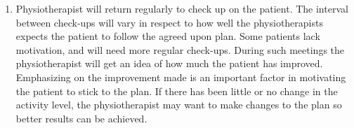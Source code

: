 \begin{enumerate}
  \item Physiotherapist will return regularly to check up on the patient. The interval between check-ups will vary in respect to how well the physiotherapists expects the patient to follow the agreed upon plan. Some patients lack motivation, and will need more regular check-ups. During such meetings the physiotherapist will get an idea of how much the patient has improved. Emphasizing on the improvement made is an important factor in motivating the patient to stick to the plan. If there has been little or no change in the activity level, the physiotherapist may want to make changes to the plan so better results can be achieved.
\end{enumerate}
